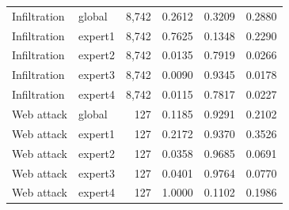 \begin{longtable}{llrrrr}
Infiltration & global & 8,742 & 0.2612 & 0.3209 & 0.2880 \\
Infiltration & expert1 & 8,742 & 0.7625 & 0.1348 & 0.2290 \\
Infiltration & expert2 & 8,742 & 0.0135 & 0.7919 & 0.0266 \\
Infiltration & expert3 & 8,742 & 0.0090 & 0.9345 & 0.0178 \\
Infiltration & expert4 & 8,742 & 0.0115 & 0.7817 & 0.0227 \\
Web attack & global & 127 & 0.1185 & 0.9291 & 0.2102 \\
Web attack & expert1 & 127 & 0.2172 & 0.9370 & 0.3526 \\
Web attack & expert2 & 127 & 0.0358 & 0.9685 & 0.0691 \\
Web attack & expert3 & 127 & 0.0401 & 0.9764 & 0.0770 \\
Web attack & expert4 & 127 & 1.0000 & 0.1102 & 0.1986 \\
\bottomrule
\end{longtable}
